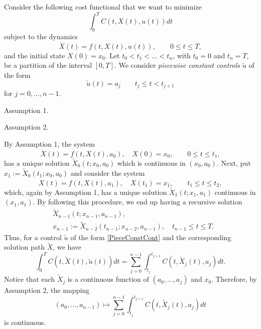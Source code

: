 Consider the following cost functional that we want to minimize
\begin{equation}\label{costFunctional}
  \int_0^T C(t,X(t),u(t)) dt
\end{equation}
subject to the dynamics
\begin{equation}\label{dynamics}
  \dot{X}(t) = f(t,X(t),u(t)),  \qquad    0\leq t \leq T,
\end{equation}
and the initial state $X(0)=x_0$. Let $t_0<t_1<\ldots <t_n$, with
$t_0=0$ and $t_n=T$, be a partition of the interval $[0,T]$.
We consider {\it piecewise constant controls} $\tilde{u}$ of the form
\begin{equation}\label{PieceConstCont}
  \tilde{u}(t) = a_j\qquad t_j\leq t < t_{j+1}
\end{equation}
 for $j=0,\ldots,n-1$.

{\sc Assumption 1}.

{\sc Assumption 2}.

By Assumption 1, the system
\[
  \dot{X}(t) = f(t,X(t),a_0), \quad X(0)=x_0, \qquad    0\leq t \leq t_1,
\]
has a unique solution $\tilde{X}_0(t;x_0,a_0)$ which is continuous in
$(x_0,a_0)$.  Next, put $x_1:=\tilde{X}_0(t_1;x_0,a_0)$ and consider the system
\[
  \dot{X}(t) = f(t,X(t),a_1), \quad X(t_1)=x_1, \qquad    t_1\leq t \leq t_2,
\]
which, again by Assumption 1, has a unique solution $\tilde{X}_1(t;x_1,a_1)$
continuous in $(x_1,a_1)$. By following this procedure, we end up having a
recursive solution
\begin{equation*}
  \begin{aligned}
    & \tilde{X}_{n-1}(t;x_{n-1},a_{n-1}),\\
    & x_{n-1}:=\tilde{X}_{n-2}(t_{n-1};x_{n-2},a_{n-1}),
    \quad t_{n-1}\leq t \leq T.
  \end{aligned}
\end{equation*}
Thus, for a control $\tilde{u}$ of the form \eqref{PieceConstCont} and the
corresponding solution path $\tilde{X}$, we have
\[
  \int_0^T
    C(t,\tilde{X}(t),
    \tilde{u}(t)) dt =
      \sum_{j=0}^{n-1}
        \int_{t_j}^{t_{j+1}}
        C(t,\tilde{X}_j(t),a_j) dt.
\]
Notice that each $\tilde{X}_j$ is a continuous function of $(a_0,\ldots,a_j)$
and $x_0$. Therefore, by Assumption 2, the mapping
\[
  (a_0,\ldots,a_{n-1})
  \mapsto
  \sum_{j=0}^{n-1}
  \int_{t_j}^{t_{j+1}} C(t,\tilde{X}_j(t),a_j) dt
\]
is continuous.
